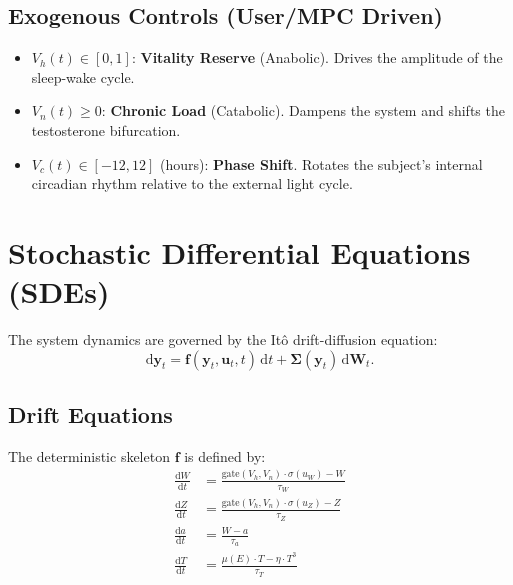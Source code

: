 \documentclass[11pt,a4paper]{article}
\begin{document}
\subsection{Exogenous Controls (User/MPC Driven)}
\begin{itemize}
    \item $V_h(t) \in [0, 1]$: \textbf{Vitality Reserve} (Anabolic). Drives the amplitude of the sleep-wake cycle.
    \item $V_n(t) \geq 0$: \textbf{Chronic Load} (Catabolic). Dampens the system and shifts the testosterone bifurcation.
    \item $V_c(t) \in [-12, 12]$ (hours): \textbf{Phase Shift}. Rotates the subject's internal circadian rhythm relative to the external light cycle.
\end{itemize}

\section{Stochastic Differential Equations (SDEs)}

The system dynamics are governed by the It\^o drift-diffusion equation:
\[
\mathrm{d}\mathbf{y}_t = \mathbf{f}(\mathbf{y}_t, \mathbf{u}_t, t) \, \mathrm{d}t + \boldsymbol{\Sigma}(\mathbf{y}_t) \, \mathrm{d}\mathbf{W}_t.
\]

\subsection{Drift Equations}

The deterministic skeleton $\mathbf{f}$ is defined by:
\begin{align}
\frac{\mathrm{d}W}{\mathrm{d}t} &= \frac{\text{gate}(V_h, V_n) \cdot \sigma(u_W) - W}{\tau_W} \\
\frac{\mathrm{d}Z}{\mathrm{d}t} &= \frac{\text{gate}(V_h, V_n) \cdot \sigma(u_Z) - Z}{\tau_Z} \\
\frac{\mathrm{d}a}{\mathrm{d}t} &= \frac{W - a}{\tau_a} \\
\frac{\mathrm{d}T}{\mathrm{d}t} &= \frac{\mu(E) \cdot T - \eta \cdot T^3}{\tau_T}
\end{align}
\end{document}
